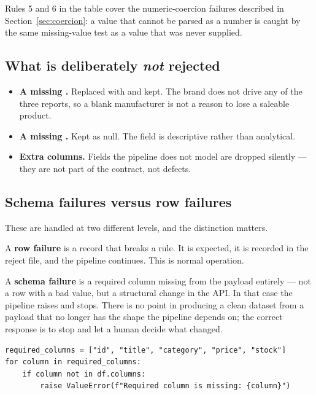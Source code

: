 Rules 5 and 6 in the table cover the numeric-coercion failures described in
Section~\ref{sec:coercion}: a value that cannot be parsed as a number is
caught by the same missing-value test as a value that was never supplied.

\subsection{What is deliberately \emph{not} rejected}

\begin{itemize}
  \item \textbf{A missing .} Replaced with  and
        kept. The brand does not drive any of the three reports, so a blank
        manufacturer is not a reason to lose a saleable product.
  \item \textbf{A missing .} Kept as null. The field is
        descriptive rather than analytical.
  \item \textbf{Extra columns.} Fields the pipeline does not model are
        dropped silently --- they are not part of the contract, not defects.
\end{itemize}

\subsection{Schema failures versus row failures}

These are handled at two different levels, and the distinction matters.

A \textbf{row failure} is a record that breaks a rule. It is expected, it is
recorded in the reject file, and the pipeline continues. This is normal
operation.

A \textbf{schema failure} is a required column missing from the payload
entirely --- not a row with a bad value, but a structural change in the API.
In that case the pipeline raises  and stops. There is no
point in producing a clean dataset from a payload that no longer has the
shape the pipeline depends on; the correct response is to stop and let a
human decide what changed.

\begin{codebox}
\noindent
\begin{lstlisting}[style=py]
required_columns = ["id", "title", "category", "price", "stock"]
for column in required_columns:
    if column not in df.columns:
        raise ValueError(f"Required column is missing: {column}")
\end{lstlisting}
\end{codebox}

